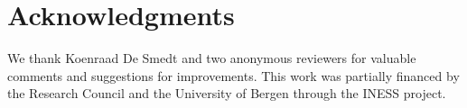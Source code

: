 \documentclass[output=paper]{langsci/langscibook}
\begin{document}

\section*{Acknowledgments}
We thank Koenraad De Smedt and two anonymous reviewers for valuable comments and suggestions for improvements.
This work was partially financed by the  Research Council and the University of Bergen through the INESS project.

 


\printbibliography[heading=subbibliography,notkeyword=this]
\end{document}
